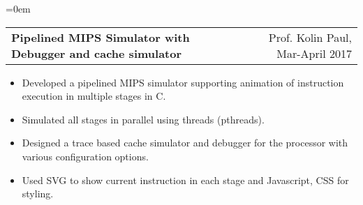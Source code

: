 \documentclass{article}
\makeatletter
\newcommand{\headerrow}[2]
{\begin{tabular*}{\linewidth}{l@{\extracolsep{\fill}}r}
    #1 &
    #2 \\
\end{tabular*}}
\makeatother
\begin{document}
\begin{list} {}{\leftmargin=0em}
    \item[]
    \headerrow {\textbf{Pipelined MIPS Simulator with Debugger and cache simulator}}{Prof. Kolin Paul, Mar-April 2017}
    \begin{itemize}
    \setlength\itemsep{0.0em}
        \item Developed a pipelined MIPS simulator supporting animation of instruction execution in multiple stages in C.
        \item Simulated all stages in parallel using threads (pthreads).
        \item Designed a trace based cache simulator and debugger for the processor with various configuration options.
        \item Used SVG to show current instruction in each stage and Javascript, CSS for styling.
    \end{itemize}

\end{list}
\end{document}
